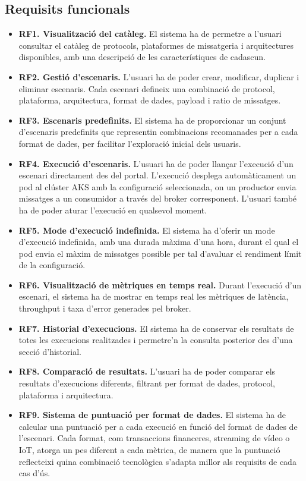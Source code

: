 \documentclass[11pt,a4paper]{article}
\begin{document}
\subsection{Requisits funcionals}
\begin{itemize}
  \item \textbf{RF1. Visualitzaci\'o del cat\`aleg.} El sistema ha de permetre a l'usuari consultar el cat\`aleg de protocols, plataformes de missatgeria i arquitectures disponibles, amb una descripci\'o de les caracter\'istiques de cadascun.
  \item \textbf{RF2. Gesti\'o d'escenaris.} L'usuari ha de poder crear, modificar, duplicar i eliminar escenaris. Cada escenari defineix una combinaci\'o de protocol, plataforma, arquitectura, format de dades, payload i ratio de missatges.
  \item \textbf{RF3. Escenaris predefinits.} El sistema ha de proporcionar un conjunt d'escenaris predefinits que representin combinacions recomanades per a cada format de dades, per facilitar l'exploraci\'o inicial dels usuaris.
  \item \textbf{RF4. Execuci\'o d'escenaris.} L'usuari ha de poder llan\c{c}ar l'execuci\'o d'un escenari directament des del portal. L'execuci\'o desplega autom\`aticament un pod al cl\'uster AKS amb la configuraci\'o seleccionada, on un productor envia missatges a un consumidor a trav\'es del broker corresponent. L'usuari tamb\'e ha de poder aturar l'execuci\'o en qualsevol moment.
  \item \textbf{RF5. Mode d'execuci\'o indefinida.} El sistema ha d'oferir un mode d'execuci\'o indefinida, amb una durada m\`axima d'una hora, durant el qual el pod envia el m\`axim de missatges possible per tal d'avaluar el rendiment l\'imit de la configuraci\'o.
  \item \textbf{RF6. Visualitzaci\'o de m\`etriques en temps real.} Durant l'execuci\'o d'un escenari, el sistema ha de mostrar en temps real les m\`etriques de lat\`encia, throughput i taxa d'error generades pel broker.
  \item \textbf{RF7. Historial d'execucions.} El sistema ha de conservar els resultats de totes les execucions realitzades i permetre'n la consulta posterior des d'una secci\'o d'historial.
  \item \textbf{RF8. Comparaci\'o de resultats.} L'usuari ha de poder comparar els resultats d'execucions diferents, filtrant per format de dades, protocol, plataforma i arquitectura.
  \item \textbf{RF9. Sistema de puntuaci\'o per format de dades.} El sistema ha de calcular una puntuaci\'o per a cada execuci\'o en funci\'o del format de dades de l'escenari. Cada format, com transaccions financeres, streaming de v\'ideo o IoT, atorga un pes diferent a cada m\`etrica, de manera que la puntuaci\'o reflecteixi quina combinaci\'o tecnol\`ogica s'adapta millor als requisits de cada cas d'\'us.

\end{itemize}
\end{document}
